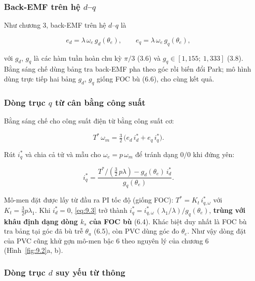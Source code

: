 \subsubsection{\texorpdfstring{Back-EMF trên hệ $d$–$q$}{Back-EMF trên hệ d–q}}\label{sec:9.2.1}

Như chương 3, back-EMF trên hệ $d$–$q$ là

\begin{equation}
e_d = \lambda\,\omega_e\, g_d(\theta_e), \qquad e_q = \lambda\,\omega_e\, g_q(\theta_e),
\tag{9.1}\label{eq:9.1}
\end{equation}

với $g_d$, $g_q$ là các hàm tuần hoàn chu kỳ $\pi/3$ (3.6) và $g_q \in [1{,}155;\ 1{,}333]$ (3.8). Bằng sáng chế dùng bảng tra back-EMF pha theo góc rồi biến đổi Park; mô hình dùng trực tiếp hai bảng $g_d$, $g_q$ giống FOC bù (6.6), cho cùng kết quả.

\subsubsection{\texorpdfstring{Dòng trục $q$ từ cân bằng công suất}{Dòng trục q từ cân bằng công suất}}\label{sec:9.2.2}

Bằng sáng chế cho công suất điện từ bằng công suất cơ:

\begin{equation}
T^*\,\omega_m = \tfrac32\,\big(e_d\, i_d^* + e_q\, i_q^*\big).
\tag{9.2}\label{eq:9.2}
\end{equation}

Rút $i_q^*$ và chia cả tử và mẫu cho $\omega_e = p\,\omega_m$ để tránh dạng $0/0$ khi đứng yên:

\begin{equation}
i_q^* = \frac{T^*/(\tfrac32\,p\lambda) - g_d(\theta_e)\, i_d^*}{g_q(\theta_e)}.
\tag{9.3}\label{eq:9.3}
\end{equation}

Mô-men đặt được lấy từ đầu ra PI tốc độ (giống FOC): $T^* = K_t\, i_{q,\omega}^*$ với $K_t = \tfrac32 p\lambda_1$. Khi $i_d^* = 0$, \eqref{eq:9.3} trở thành $i_q^* = i_{q,\omega}^*\,(\lambda_1/\lambda)/g_q(\theta_e)$, \textbf{trùng với khâu định dạng dòng $k_s$ của FOC bù} (6.4). Khác biệt duy nhất là FOC bù tra bảng tại góc đã bù trễ $\theta_a$ (6.5), còn PVC dùng góc đo $\theta_e$. Như vậy dòng đặt của PVC cũng khử gợn mô-men bậc 6 theo nguyên lý của chương 6 (Hình~\ref{fig:9.2}a, b).

\subsubsection{\texorpdfstring{Dòng trục $d$ suy yếu từ thông}{Dòng trục d suy yếu từ thông}}\label{sec:9.2.3}

